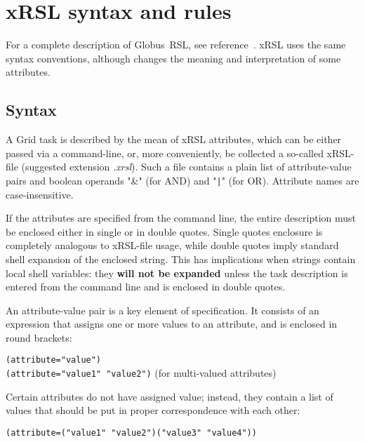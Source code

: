 \documentclass{book}
\newcommand{\globus}{Globus\textsuperscript{\textregistered}}
\begin{document}
  \chapter{xRSL syntax and rules}
  \label{sec:remarks}

  For a complete description of \globus\  RSL, see
  reference~\cite{rsl}. xRSL uses the same syntax conventions,
  although changes the meaning and interpretation of some attributes.

  \section{Syntax}
  \label{sec:syntax}

  A Grid task is described by the mean of xRSL attributes, which can
  be either passed via a command-line, or, more conveniently, be
  collected a so-called xRSL-file (suggested extension
  \textit{.xrsl}). Such a file contains a plain list of attribute-value pairs
  and boolean operands "\&" (for AND) and "\verb#|#" (for
  OR). Attribute names are case-insensitive.

  If the attributes are specified from the command line, the entire
  description must be enclosed either in single or in double quotes.
  Single quotes enclosure is completely analogous to xRSL-file usage,
  while double quotes imply standard shell expansion of the enclosed
  string. This has implications when strings contain local shell
  variables: they \textbf{will not be expanded} unless the task description is
  entered from the command line and is enclosed in double quotes.

  An attribute-value pair is a key element of specification. It
  consists of an expression that assigns one or more values to an
  attribute, and is enclosed in round brackets:

  \begin{shaded}
    \verb#(attribute="value")#\\
    \verb#(attribute="value1" "value2")# (for multi-valued attributes)\\
  \end{shaded}

  Certain attributes do not have assigned value; instead, they contain
  a list of values that should be put in proper correspondence with
  each other:

  \begin{shaded}
    \verb#(attribute=("value1" "value2")("value3" "value4"))#
  \end{shaded}
\end{document}
